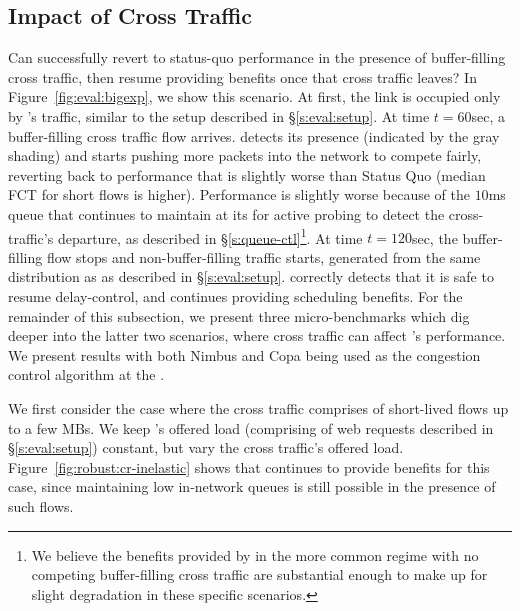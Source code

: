 \subsection{Impact of Cross Traffic}\label{s:robust:cross}



Can \name successfully revert to status-quo performance in the presence of buffer-filling cross traffic, then resume providing benefits once that cross traffic leaves?
In Figure~\ref{fig:eval:bigexp}, we show this scenario.
At first, the link is occupied only by \name's traffic, similar to the setup described in \S\ref{s:eval:setup}.
At time $t=60$sec, a buffer-filling cross traffic flow arrives.
\name detects its presence (indicated by the gray shading) and starts pushing more packets into the network to compete fairly, reverting back to performance that is slightly worse than Status Quo (median FCT for short flows is \bigexpElasticSlowdownWorseness higher). 
Performance is slightly worse because of the $10$ms queue that \name continues to maintain at its \inbox for active probing to detect the cross-traffic's departure, as described in \S\ref{s:queue-ctl}\footnote{We believe the benefits provided by \name in the more common regime with no competing buffer-filling cross traffic are substantial enough to make up for slight degradation in these specific scenarios.}. 
At time $t=120$sec, the buffer-filling flow stops and non-buffer-filling traffic starts, generated from the same distribution as \name as described in \S\ref{s:eval:setup}.
\name correctly detects that it is safe to resume delay-control, and continues providing scheduling benefits.
For the remainder of this subsection, we present three micro-benchmarks which dig deeper into the latter two scenarios, where cross traffic can affect \name's performance. 
We present results with both Nimbus and Copa being used as the congestion control algorithm at the \inbox.


 We first consider the case where the cross traffic comprises of short-lived flows up to a few MBs.
We keep \name's offered load (comprising of web requests described in \S\ref{s:eval:setup}) constant, but vary the cross traffic's offered load.
Figure~\ref{fig:robust:cr-inelastic} shows that \name continues to provide benefits for this case, since maintaining low in-network queues is still possible in the presence of such flows.

